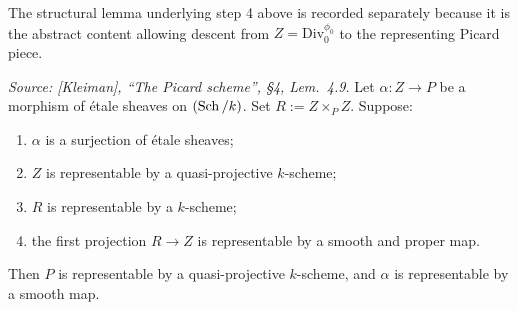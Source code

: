 The structural lemma underlying step 4 above is recorded separately
because it is the abstract content allowing descent from
\(Z = \mathrm{Div}^{\phi_0}_0\) to the representing Picard piece.

\begin{lemma}
  \label{lem:smooth_proper_quotient}
  \textit{Source: [Kleiman], ``The Picard scheme'', \S 4, Lem.~4.9.}
  Let \(\alpha : Z \to P\) be a morphism of \'etale sheaves on \((\operatorname{Sch}/k)\).
  Set \(R := Z \times_P Z\). Suppose:
  \begin{enumerate}
    \item \(\alpha\) is a surjection of \'etale sheaves;
    \item \(Z\) is representable by a quasi-projective \(k\)-scheme;
    \item \(R\) is representable by a \(k\)-scheme;
    \item the first projection \(R \to Z\) is representable by a smooth
      and proper map.
  \end{enumerate}
  Then \(P\) is representable by a quasi-projective \(k\)-scheme, and \(\alpha\)
  is representable by a smooth map.
\end{lemma}

